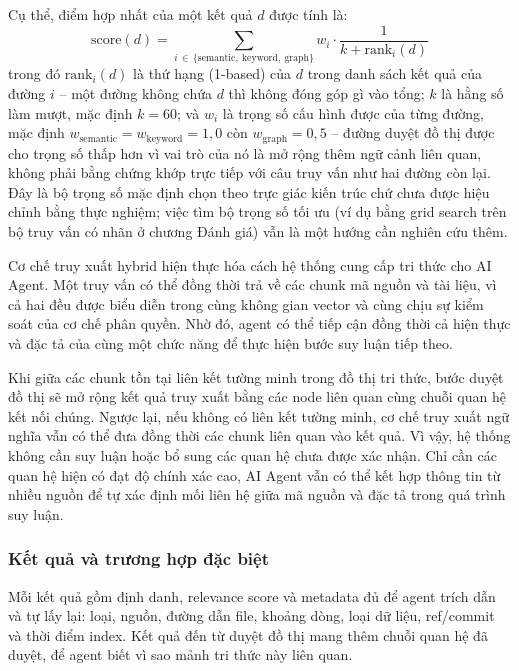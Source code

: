 Cụ thể, điểm hợp nhất của một kết quả $d$ được tính là:
\[
\text{score}(d) = \sum_{i \,\in\, \{\text{semantic},\ \text{keyword},\ \text{graph}\}} w_i \cdot \frac{1}{k + \text{rank}_i(d)}
\]
trong đó $\text{rank}_i(d)$ là thứ hạng (1-based) của $d$ trong danh sách kết quả của đường $i$ -- một đường không chứa $d$ thì không đóng góp gì vào tổng; $k$ là hằng số làm mượt, mặc định $k = 60$; và $w_i$ là trọng số cấu hình được của từng đường, mặc định $w_{\text{semantic}} = w_{\text{keyword}} = 1{,}0$ còn $w_{\text{graph}} = 0{,}5$ -- đường duyệt đồ thị được cho trọng số thấp hơn vì vai trò của nó là mở rộng thêm ngữ cảnh liên quan, không phải bằng chứng khớp trực tiếp với câu truy vấn như hai đường còn lại. Đây là bộ trọng số mặc định chọn theo trực giác kiến trúc chứ chưa được hiệu chỉnh bằng thực nghiệm; việc tìm bộ trọng số tối ưu (ví dụ bằng grid search trên bộ truy vấn có nhãn ở chương Đánh giá) vẫn là một hướng cần nghiên cứu thêm.

Cơ chế truy xuất hybrid hiện thực hóa cách hệ thống cung cấp tri thức cho AI Agent. Một truy vấn có thể đồng thời trả về các chunk mã nguồn và tài liệu, vì cả hai đều được biểu diễn trong cùng không gian vector và cùng chịu sự kiểm soát của cơ chế phân quyền. Nhờ đó, agent có thể tiếp cận đồng thời cả hiện thực và đặc tả của cùng một chức năng để thực hiện bước suy luận tiếp theo.

Khi giữa các chunk tồn tại liên kết tường minh trong đồ thị tri thức, bước duyệt đồ thị sẽ mở rộng kết quả truy xuất bằng các node liên quan cùng chuỗi quan hệ kết nối chúng. Ngược lại, nếu không có liên kết tường minh, cơ chế truy xuất ngữ nghĩa vẫn có thể đưa đồng thời các chunk liên quan vào kết quả. Vì vậy, hệ thống không cần suy luận hoặc bổ sung các quan hệ chưa được xác nhận. Chỉ cần các quan hệ hiện có đạt độ chính xác cao, AI Agent vẫn có thể kết hợp thông tin từ nhiều nguồn để tự xác định mối liên hệ giữa mã nguồn và đặc tả trong quá trình suy luận.

\subsubsection{Kết quả và trương hợp đặc biệt}

Mỗi kết quả gồm định danh, relevance score và metadata đủ để agent trích dẫn và tự lấy lại: loại, nguồn, đường dẫn file, khoảng dòng, loại dữ liệu, ref/commit và thời điểm index. Kết quả đến từ duyệt đồ thị mang thêm chuỗi quan hệ đã duyệt, để agent biết vì sao mảnh tri thức này liên quan.

